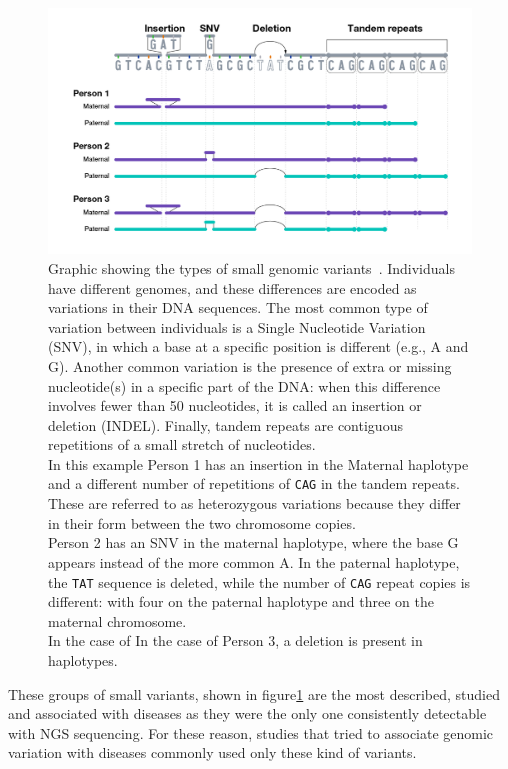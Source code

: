 \begin{figure}[!ht]
	\centering
	\includegraphics[width=\linewidth]{figures/background/small_variants.png}
	\caption[Small genomic variants.]{Graphic showing the types of small genomic variants~\cite{nih_variation}. Individuals have different genomes, and these differences are encoded as variations in their DNA sequences. The most common type of variation between individuals is a Single Nucleotide Variation (SNV), in which a base at a specific position is different (e.g., A and G). Another common variation is the presence of extra or missing nucleotide(s) in a specific part of the DNA: when this difference involves fewer than 50 nucleotides, it is called an insertion or deletion (INDEL). Finally, tandem repeats are contiguous repetitions of a small stretch of nucleotides.\\ In this example Person 1 has an insertion in the Maternal haplotype and a different number of repetitions of \texttt{CAG} in the tandem repeats. These are referred to as heterozygous variations because they differ in their form between the two chromosome copies.\\ Person 2 has an SNV in the maternal haplotype, where the base G appears instead of the more common A. In the paternal haplotype,  the \texttt{TAT} sequence is deleted, while the number of \texttt{CAG} repeat copies is different: with four on the paternal haplotype and three on the maternal chromosome. \\ In the case of In the case of Person 3, a deletion is present in haplotypes.}
	\label{fig:small_variants}
\end{figure}
These groups of small variants, shown in figure\ref{fig:small_variants} are the most described, studied and associated with diseases as they were the only one consistently detectable with NGS sequencing. For these reason, studies that tried to associate genomic variation with diseases commonly used only these kind of variants.\\
